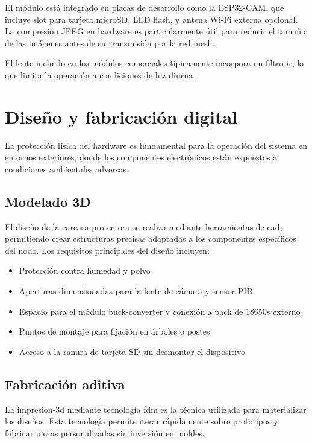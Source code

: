\documentclass[a4paper, 12pt]{report}
\begin{document}
El módulo está integrado en placas de desarrollo como la ESP32-CAM, que incluye
slot para tarjeta microSD, LED flash, y antena Wi-Fi externa opcional. La
compresión JPEG en hardware es particularmente útil para reducir el tamaño de
las imágenes antes de su transmisión por la red \gls{mesh}.

El lente incluido en los módulos comerciales típicamente incorpora un filtro
\gls{ir}, lo que limita la operación a condiciones de luz diurna.

\section{Diseño y fabricación digital}

La protección física del hardware es fundamental para la operación del sistema
en entornos exteriores, donde los componentes electrónicos están expuestos a
condiciones ambientales adversas.

\subsection{Modelado 3D}

El diseño de la \gls{carcasa} protectora se realiza mediante herramientas de
\gls{cad}, permitiendo crear estructuras precisas adaptadas a los componentes
específicos del nodo. Los requisitos principales del diseño incluyen:

\begin{itemize}
  \item Protección contra humedad y polvo
  \item Aperturas dimensionadas para la lente de cámara y sensor PIR
  \item Espacio para el módulo \gls{buck-converter} y conexión a pack de
    \glspl{18650} externo
  \item Puntos de montaje para fijación en árboles o postes
  \item Acceso a la ranura de tarjeta SD sin desmontar el dispositivo
\end{itemize}

\subsection{Fabricación aditiva}

La \gls{impresion-3d} mediante tecnología \gls{fdm} es la técnica utilizada para
materializar los diseños. Esta tecnología permite iterar rápidamente sobre
prototipos y fabricar piezas personalizadas sin inversión en moldes.
\end{document}
